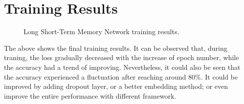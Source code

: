 \documentclass[a4paper,12pt]{article}
\begin{document}
\section*{Training Results}
\begin{figure}[!htb]
   \captionsetup[subfigure]{justification=centering}
   \centering
   \hspace{0.5cm}%
   \caption{Long Short-Term Memory Network training results.}
\end{figure}
The above shows the final training results. It can be observed that, 
during traning, the loss gradually decreased with the increase of epoch number,
while the accuracy had a trend of improving. 
Nevertheless, it could also be seen that the accuracy experienced a fluctuation after 
reaching around 80\%. 
It could be improved by adding dropout layer, or a better embedding method; or
even improve the entire performance with different framework.



% 
\end{document}
